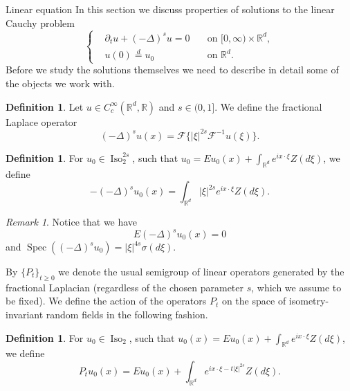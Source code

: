 \documentclass[a4paper,10pt,fleqn]{amsart}
\theoremstyle{remark}
\newtheorem{remark}[theorem]{Remark}
\theoremstyle{definition}
\newtheorem{definition}[theorem]{Definition}
\DeclareMathOperator{\Iso}{Iso}
\DeclareMathOperator{\Spec}{Spec}
\newcommand{\dt} {\partial_t}
\newcommand{\X} {{\mathbb{R}^d}}
\newcommand{\R} {\mathbb{R}}
\newcommand{\T} {[0,\infty)}
\renewcommand{\=} {\overset{d}{=}}
\newcommand{\fLap} {(-\Delta)^s}
\begin{document}
    \begin{section}{Linear equation}\label{linear-equation}
      In this section we discuss properties of solutions to the linear Cauchy problem
      \begin{equation}\label{heat}
        \left\{
        \begin{aligned}
          &\dt u + \fLap u = 0\quad&\text{on $\T\times\X$}, \\
          &u(0) \= u_0\quad&\text{on $\X$}.
        \end{aligned}
        \right.
      \end{equation}
      Before we study the solutions themselves we need to describe in detail some of the objects we work with.
      \begin{definition}\label{flap}
      Let $u\in C_c^\infty(\X,\R)$ and $s\in(0,1]$. We define the fractional Laplace operator
     \begin{equation*}
      \fLap u(x) = \mathcal{F}\{|\xi|^{2s}\mathcal{F}^{-1}u(\xi)\}.
     \end{equation*}
     \end{definition}
     \begin{definition}\label{iso-fractional-laplacian}
     For $u_0\in\Iso^{2s}_2$, such that $u_0=Eu_0(x)+ \int_\X e^{ix\cdot\xi}Z(d\xi)$, we define
         \begin{equation*}
             -\fLap u_0(x) = \int_\X |\xi|^{2s}e^{ix\cdot\xi}Z(d\xi).
         \end{equation*}
     \end{definition}
     \begin{remark}\label{flap-prop}
      Notice that we have
         \begin{equation*}
             E\fLap u_0(x) = 0
         \end{equation*}
         and $\Spec(\fLap u_0)=|\xi|^{4s}\sigma(d\xi)$.
     \end{remark}
     By $\{P_t\}_{t\geq0}$ we denote the usual semigroup of linear operators
     generated by the fractional Laplacian (regardless of the chosen parameter $s$, which we assume to be fixed).
         We define the action of the operators $P_t$ on the space of isometry-invariant random fields
         in the following fashion.
         \begin{definition}\label{semigroup-definition}
         For $u_0\in\Iso_2$, such that $u_0(x)=Eu_0(x)+\int_\X e^{ix\cdot\xi}Z(d\xi)$, we define
         \begin{equation*}
            P_tu_0(x) = Eu_0(x)+\int_\X e^{ix\cdot\xi-t|\xi|^{2s}}Z(d\xi).

\end{equation*}
\end{definition}
\end{section}
\end{document}

